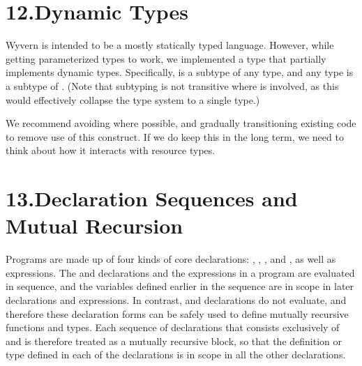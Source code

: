 \documentclass{article}
\begin{document}
\section{12.\hspace*{0.5em}Dynamic Types}\label{sec-dynamic-types}%

\noindent{}Wyvern is intended to be a mostly statically typed language.  However,
while getting parameterized types to work, we implemented a  type that
partially implements dynamic types.  Specifically,  is a subtype
of any type, and any type is a subtype of .  (Note that subtyping
is not transitive where  is involved, as this would effectively
collapse the type system to a single type.)%

We recommend avoiding  where possible, and gradually transitioning
existing  code to remove use of this construct.  If we do keep this
in the long term, we need to think about how it interacts with resource
types.%

\section{13.\hspace*{0.5em}Declaration Sequences and Mutual Recursion}\label{sec-declaration-sequences-and-mutual-recursion}%

\noindent{}Programs are made up of four kinds of core
declarations: , , , and , as well as expressions.
The  and  declarations and the expressions in a program
are evaluated
in sequence, and the variables defined earlier in the sequence are
in scope in later declarations and expressions.  In contrast,
 and  declarations do not evaluate, and therefore these
declaration forms can be safely used to define mutually recursive
functions and types.  Each sequence of declarations that consists
exclusively of  and  is therefore treated as a mutually
recursive block, so that the definition or type defined in each of
the declarations is in scope in all the other declarations.%
\end{document}
